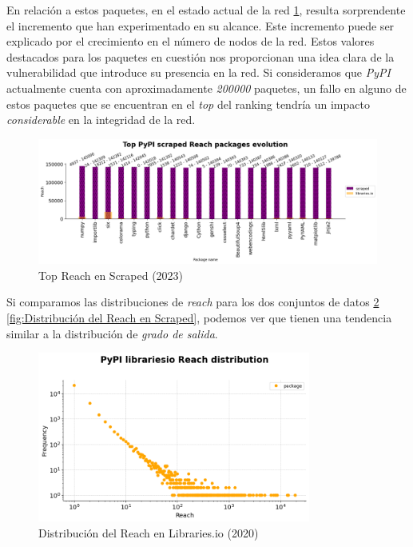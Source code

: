 En relación a estos paquetes, en el estado actual de la red \ref{fig:Top Reach en Scraped}, resulta sorprendente el incremento
que han experimentado en su alcance. Este incremento puede ser explicado por el crecimiento en el
número de nodos de la red. Estos valores destacados para los paquetes en cuestión nos proporcionan
una idea clara de la vulnerabilidad que introduce su presencia en la red. Si consideramos que
\textit{PyPI} actualmente cuenta con aproximadamente \textit{200000} paquetes, un fallo en alguno de estos paquetes
que se encuentran en el \textit{top} del ranking tendría un impacto \textit{considerable} en la integridad de la red.


\begin{figure}[ht!]
    \begin{center}
        \includegraphics[width=1\textwidth]{img/pypi/top_scraped_reach_evolution.png}
        \caption{Top Reach en Scraped (2023)}
    \end{center}
    \label{fig:Top Reach en Scraped}
\end{figure}


Si comparamos las distribuciones de \textit{reach} para los dos conjuntos de datos
\ref{fig:Distribución del Reach en Libraries.io} \ref{fig:Distribución del Reach en Scraped},
podemos ver que tienen una tendencia similar a la distribución de \textit{grado de salida}.

\begin{figure}[ht!]
    \begin{center}
        \includegraphics[width=0.8\textwidth]{img/pypi/librariesio_reach_distribution.png}
        \caption{Distribución del Reach en Libraries.io (2020)}
    \end{center}
    \label{fig:Distribución del Reach en Libraries.io}
\end{figure}

